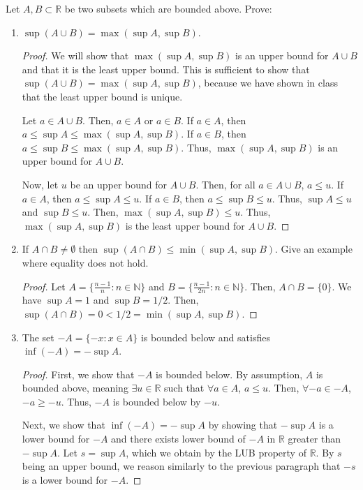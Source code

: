 \documentclass[10pt]{article}
\newcommand{\N}{\mathbb{N}}
\newcommand{\R}{\mathbb{R}}
\newenvironment{problem}[2][Problem]{\begin{trivlist}
\item[\hskip \labelsep {\bfseries #1}\hskip \labelsep {\bfseries #2.}]}{\end{trivlist}}
\begin{document}
\begin{problem}{3}
	Let $ A,B \subset \R $ be two subsets which are bounded above. Prove:
	\begin{enumerate}
		\item $ \sup(A \cup B) = \max(\sup A, \sup B) $.
            \begin{proof}
                We will show that $\max(\sup A, \sup B)$ is an upper bound for $A \cup B$ and that it is the least upper bound. This is sufficient to show that $\sup(A \cup B) = \max(\sup A, \sup B)$, because we have shown in class that the least upper bound is unique.

                Let $a \in A \cup B$. Then, $a \in A$ or $a \in B$. If $a \in A$, then $a \leq \sup A \leq \max(\sup A, \sup B)$. If $a \in B$, then $a \leq \sup B \leq \max(\sup A, \sup B)$. Thus, $\max(\sup A, \sup B)$ is an upper bound for $A \cup B$.

                Now, let $u$ be an upper bound for $A \cup B$. Then, for all $a \in A \cup B$, $a \leq u$. If $a \in A$, then $a \leq \sup A \leq u$. If $a \in B$, then $a \leq \sup B \leq u$.
                Thus, $\sup A \leq u$ and $\sup B \leq u$. Then, $\max(\sup A, \sup B) \leq u$. Thus, $\max(\sup A, \sup B)$ is the least upper bound for $A \cup B$.
                
            \end{proof}
		\item If $ A \cap B \neq \emptyset $ then $ \sup(A \cap B) \leq \min(\sup A, \sup B) $. Give an example where equality does not hold.
            \begin{proof}
                Let $A = \{ \frac{n-1}{n} : n \in \N \}$ and $B = \{ \frac{n-1}{2n} : n \in \N \}$. Then, $A \cap B = \{0\}$. We have $\sup A = 1$ and $\sup B = 1/2$. Then, $\sup(A \cap B) = 0 < 1/2 = \min(\sup A, \sup B)$.
            \end{proof}
		\item The set $ -A=\{ -x: x \in A \} $ is bounded below and satisfies $ \inf(-A)=-\sup A $.
            \begin{proof}
                First, we show that $-A$ is bounded below. By assumption, $A$ is bounded above, meaning $\exists u \in \R$ such that $\forall a \in A$, $a \leq u$. Then, $\forall -a \in -A$, $-a \geq -u$. Thus, $-A$ is bounded below by $-u$.
                
                Next, we show that $\inf(-A) = -\sup A$ by showing that $-\sup A$ is a lower bound for $-A$ and there exists lower bound of $-A$ in $\R$ greater than $-\sup A$.
                Let $s = \sup A$, which we obtain by the LUB property of $\R$. By $s$ being an upper bound, we reason similarly to the previous paragraph that $-s$ is a lower bound for $-A$.


\end{proof}
\end{enumerate}
\end{problem}
\end{document}
